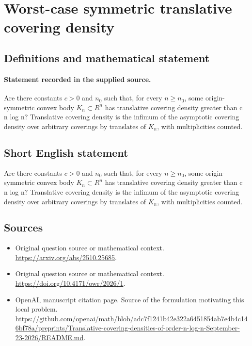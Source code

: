 \documentclass[11pt]{article}
\begin{document}
\section*{Worst-case symmetric translative covering density}\label{statement}
\subsection{Definitions and mathematical statement}
\paragraph{Statement recorded in the supplied source.}
Are there constants $c>0$ and $n_{0}$ such that, for every $n\geq n_{0}$, some origin-symmetric convex body $K_n\subset R^{n}$ has translative covering density greater than c n log n? Translative covering density is the infimum of the asymptotic covering density over arbitrary coverings by translates of $K_n$, with multiplicities counted.
\subsection{Short English statement}
Are there constants $c>0$ and $n_{0}$ such that, for every $n\geq n_{0}$, some origin-symmetric convex body $K_n\subset R^{n}$ has translative covering density greater than c n log n? Translative covering density is the infimum of the asymptotic covering density over arbitrary coverings by translates of $K_n$, with multiplicities counted.
\subsection{Sources}
\begin{itemize}
\item[S1] Original question source or mathematical context.
\url{https://arxiv.org/abs/2510.25685}.
\item[S2] Original question source or mathematical context.
\url{https://doi.org/10.4171/owr/2026/1}.
\item[S3] OpenAI, manuscript citation page. Source of the formulation motivating this local problem.
\url{https://github.com/openai/math/blob/adc7f1241b42e322a6451854ab7e4b4c146bf78a/preprints/Translative-covering-densities-of-order-n-log-n-September-23-2026/README.md}.
\end{itemize}
\end{document}

